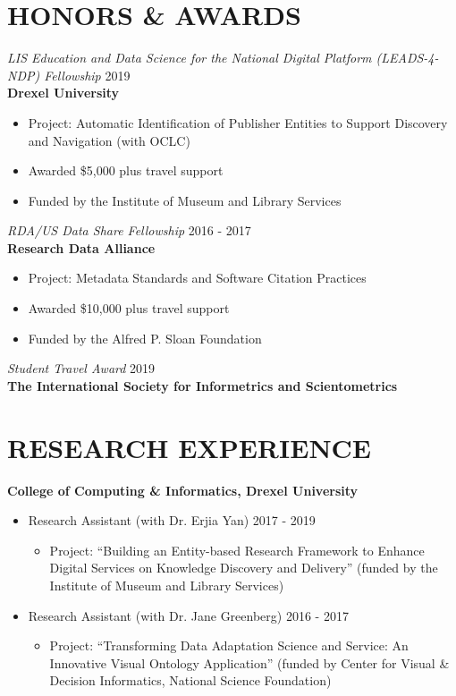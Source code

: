 \documentclass[margin, 10pt]{res} %
\begin{document}
\begin{resume}
\section{HONORS \& AWARDS}

{\sl LIS Education and Data Science for the National Digital Platform (LEADS-4-NDP) Fellowship}  \hfill 2019 \\
\textbf{Drexel University}
\begin{itemize}
\item Project: Automatic Identification of Publisher Entities to Support Discovery and Navigation (with OCLC)
\item Awarded \$5,000 plus travel support
\item Funded by the Institute of Museum and Library Services
\end{itemize} 

{\sl RDA/US Data Share Fellowship}  \hfill 2016 - 2017 \\
\textbf{Research Data Alliance}
\begin{itemize}
\item Project: Metadata Standards and Software Citation Practices
\item Awarded \$10,000 plus travel support
\item Funded by the Alfred P. Sloan Foundation
\end{itemize} 

{\sl Student Travel Award} \hfill 2019 \\
\textbf{The International Society for Informetrics and Scientometrics}

\section{RESEARCH EXPERIENCE}

\textbf{College of Computing \& Informatics, Drexel University}\\
\begin{itemize}
     \item Research Assistant (with Dr. Erjia Yan) \hfill 2017 - 2019
     \begin{itemize}
     	\item  Project: “Building an Entity-based Research Framework to Enhance Digital Services on Knowledge Discovery and Delivery” (funded by the Institute of Museum and Library Services)
   	\end{itemize}
   	\item Research Assistant (with Dr. Jane Greenberg) \hfill 2016 - 2017
     \begin{itemize}
     	\item  Project: “Transforming Data Adaptation Science and Service: An Innovative Visual Ontology Application” (funded by Center for Visual \& Decision Informatics, National Science Foundation)
   	\end{itemize}
\end{itemize}


\end{resume}
\end{document}
